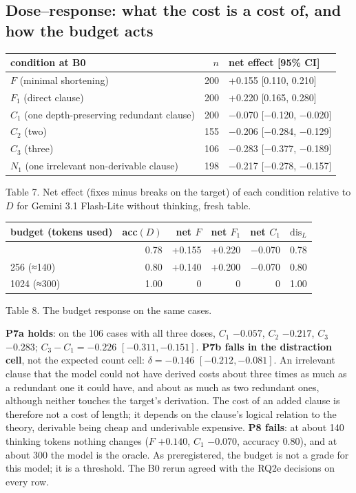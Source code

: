 \subsection{Dose--response: what the cost is a cost of, and how the budget acts}\label{doseresponse-what-the-cost-is-a-cost-of-and-how-the-budget-acts}

{\def\LTcaptype{none} %
\begin{longtable}[]{@{}lrl@{}}
\toprule\noalign{}
condition at B0 & \(n\) & net effect {[}95\% CI{]} \\
\midrule\noalign{}
\endhead
\bottomrule\noalign{}
\endlastfoot
\(F\) (minimal shortening) & 200 & +0.155 {[}0.110, 0.210{]} \\
\(F_1\) (direct clause) & 200 & +0.220 {[}0.165, 0.280{]} \\
\(C_1\) (one depth-preserving redundant clause) & 200 & −0.070 {[}−0.120, −0.020{]} \\
\(C_2\) (two) & 155 & −0.206 {[}−0.284, −0.129{]} \\
\(C_3\) (three) & 106 & −0.283 {[}−0.377, −0.189{]} \\
\(N_1\) (one irrelevant non-derivable clause) & 198 & −0.217 {[}−0.278, −0.157{]} \\
\end{longtable}
}

Table 7. Net effect (fixes minus breaks on the target) of each condition relative to \(D\) for Gemini 3.1 Flash-Lite without thinking, fresh table.

{\def\LTcaptype{none} %
\begin{longtable}[]{@{}lrrrrr@{}}
\toprule\noalign{}
budget (tokens used) & acc\((D)\) & net \(F\) & net \(F_1\) & net \(C_1\) & \(\mathrm{dis}_L\) \\
\midrule\noalign{}
\endhead
\bottomrule\noalign{}
\endlastfoot
0 & 0.78 & +0.155 & +0.220 & −0.070 & 0.78 \\
256 (≈140) & 0.80 & +0.140 & +0.200 & −0.070 & 0.80 \\
1024 (≈300) & 1.00 & 0 & 0 & 0 & 1.00 \\
\end{longtable}
}

Table 8. The budget response on the same cases.

\textbf{P7a holds}: on the 106 cases with all three doses, \(C_1\) \(-0.057\), \(C_2\) \(-0.217\), \(C_3\) \(-0.283\); \(C_3-C_1=-0.226\) \([-0.311,-0.151]\). \textbf{P7b falls in the distraction cell}, not the expected count cell: \(\delta=-0.146\) \([-0.212,-0.081]\). An irrelevant clause that the model could not have derived costs about three times as much as a redundant one it could have, and about as much as two redundant ones, although neither touches the target's derivation. The cost of an added clause is therefore not a cost of length; it depends on the clause's logical relation to the theory, derivable being cheap and underivable expensive. \textbf{P8 fails}: at about 140 thinking tokens nothing changes (\(F\) \(+0.140\), \(C_1\) \(-0.070\), accuracy \(0.80\)), and at about 300 the model is the oracle. As preregistered, the budget is not a grade for this model; it is a threshold. The B0 rerun agreed with the RQ2e decisions on every row.

